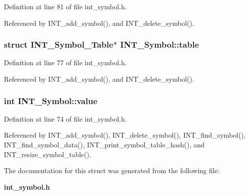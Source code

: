 Definition at line 81 of file int\_\-symbol.h.

Referenced by INT\_\-add\_\-symbol(), and INT\_\-delete\_\-symbol().
\subsubsection{\setlength{\rightskip}{0pt plus 5cm}struct \bf{INT\_\-Symbol\_\-Table}$\ast$ \bf{INT\_\-Symbol::table}}\label{structINT__Symbol_79e71593235dd86bf3577909f9bf8423}




Definition at line 77 of file int\_\-symbol.h.

Referenced by INT\_\-add\_\-symbol(), and INT\_\-delete\_\-symbol().
\subsubsection{\setlength{\rightskip}{0pt plus 5cm}int \bf{INT\_\-Symbol::value}}\label{structINT__Symbol_36e57f163da72b9608d16bcdd99781dc}




Definition at line 74 of file int\_\-symbol.h.

Referenced by INT\_\-add\_\-symbol(), INT\_\-delete\_\-symbol(), INT\_\-find\_\-symbol(), INT\_\-find\_\-symbol\_\-data(), INT\_\-print\_\-symbol\_\-table\_\-hash(), and INT\_\-resize\_\-symbol\_\-table().

The documentation for this struct was generated from the following file:\begin{CompactItemize}
\item 
\bf{int\_\-symbol.h}\end{CompactItemize}
